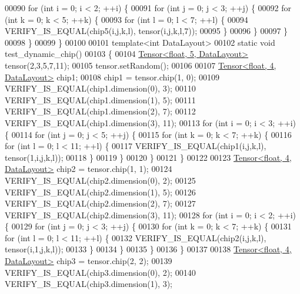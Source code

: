 \begin{DoxyCode}
00090   \textcolor{keywordflow}{for} (\textcolor{keywordtype}{int} i = 0; i < 2; ++i) \{
00091     \textcolor{keywordflow}{for} (\textcolor{keywordtype}{int} j = 0; j < 3; ++j) \{
00092       \textcolor{keywordflow}{for} (\textcolor{keywordtype}{int} k = 0; k < 5; ++k) \{
00093         \textcolor{keywordflow}{for} (\textcolor{keywordtype}{int} l = 0; l < 7; ++l) \{
00094           VERIFY\_IS\_EQUAL(chip5(i,j,k,l), tensor(i,j,k,l,7));
00095         \}
00096       \}
00097     \}
00098   \}
00099 \}
00100 
00101 \textcolor{keyword}{template}<\textcolor{keywordtype}{int} DataLayout>
00102 \textcolor{keyword}{static} \textcolor{keywordtype}{void} test\_dynamic\_chip()
00103 \{
00104   \hyperlink{class_eigen_1_1_tensor}{Tensor<float, 5, DataLayout>} tensor(2,3,5,7,11);
00105   tensor.setRandom();
00106 
00107   \hyperlink{class_eigen_1_1_tensor}{Tensor<float, 4, DataLayout>} chip1;
00108   chip1 = tensor.chip(1, 0);
00109   VERIFY\_IS\_EQUAL(chip1.dimension(0), 3);
00110   VERIFY\_IS\_EQUAL(chip1.dimension(1), 5);
00111   VERIFY\_IS\_EQUAL(chip1.dimension(2), 7);
00112   VERIFY\_IS\_EQUAL(chip1.dimension(3), 11);
00113   \textcolor{keywordflow}{for} (\textcolor{keywordtype}{int} i = 0; i < 3; ++i) \{
00114     \textcolor{keywordflow}{for} (\textcolor{keywordtype}{int} j = 0; j < 5; ++j) \{
00115       \textcolor{keywordflow}{for} (\textcolor{keywordtype}{int} k = 0; k < 7; ++k) \{
00116         \textcolor{keywordflow}{for} (\textcolor{keywordtype}{int} l = 0; l < 11; ++l) \{
00117           VERIFY\_IS\_EQUAL(chip1(i,j,k,l), tensor(1,i,j,k,l));
00118         \}
00119       \}
00120     \}
00121   \}
00122 
00123   \hyperlink{class_eigen_1_1_tensor}{Tensor<float, 4, DataLayout>} chip2 = tensor.chip(1, 1);
00124   VERIFY\_IS\_EQUAL(chip2.dimension(0), 2);
00125   VERIFY\_IS\_EQUAL(chip2.dimension(1), 5);
00126   VERIFY\_IS\_EQUAL(chip2.dimension(2), 7);
00127   VERIFY\_IS\_EQUAL(chip2.dimension(3), 11);
00128   \textcolor{keywordflow}{for} (\textcolor{keywordtype}{int} i = 0; i < 2; ++i) \{
00129     \textcolor{keywordflow}{for} (\textcolor{keywordtype}{int} j = 0; j < 3; ++j) \{
00130       \textcolor{keywordflow}{for} (\textcolor{keywordtype}{int} k = 0; k < 7; ++k) \{
00131         \textcolor{keywordflow}{for} (\textcolor{keywordtype}{int} l = 0; l < 11; ++l) \{
00132           VERIFY\_IS\_EQUAL(chip2(i,j,k,l), tensor(i,1,j,k,l));
00133         \}
00134       \}
00135     \}
00136   \}
00137 
00138   \hyperlink{class_eigen_1_1_tensor}{Tensor<float, 4, DataLayout>} chip3 = tensor.chip(2, 2);
00139   VERIFY\_IS\_EQUAL(chip3.dimension(0), 2);
00140   VERIFY\_IS\_EQUAL(chip3.dimension(1), 3);

\end{DoxyCode}
